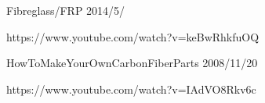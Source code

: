 \begin{thebibliography}{8}
\item
Fibreglass/FRP 2014/5/


https://www.youtube.com/watch?v=keBwRhkfuOQ
\item
HowToMakeYourOwnCarbonFiberParts 2008/11/20


https://www.youtube.com/watch?v=IAdVO8Rkv6c
\end{thebibliography}



